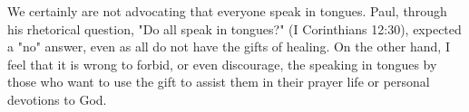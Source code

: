 We certainly are not advocating that everyone speak in tongues. Paul, through his rhetorical question, "Do all speak in tongues?" (I Corinthians 12:30), expected a "no" answer, even as all do not have the gifts of healing. On the other hand, I feel that it is wrong to forbid, or even discourage, the speaking in tongues by those who want to use the gift to assist them in their prayer life or personal devotions to God. 


